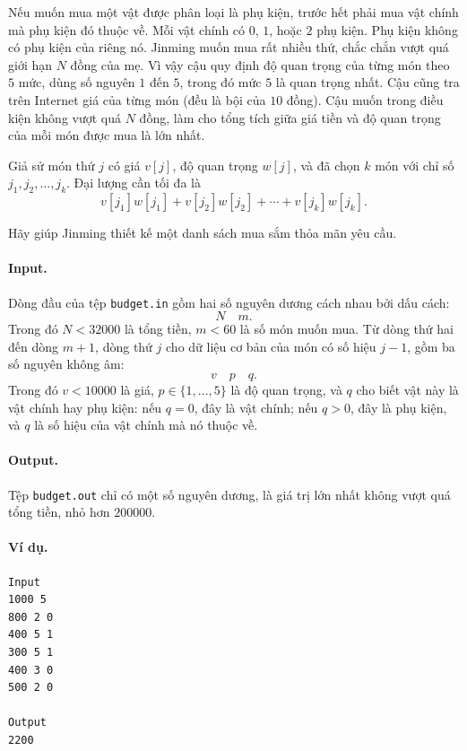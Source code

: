 \documentclass[11pt]{article}
\begin{document}
Nếu muốn mua một vật được phân loại là phụ kiện, trước hết phải mua vật chính
mà phụ kiện đó thuộc về. Mỗi vật chính có \(0\), \(1\), hoặc \(2\) phụ kiện.
Phụ kiện không có phụ kiện của riêng nó. Jinming muốn mua rất nhiều thứ, chắc
chắn vượt quá giới hạn \(N\) đồng của mẹ. Vì vậy cậu quy định độ quan trọng
của từng món theo \(5\) mức, dùng số nguyên \(1\) đến \(5\), trong đó mức \(5\)
là quan trọng nhất. Cậu cũng tra trên Internet giá của từng món (đều là bội
của \(10\) đồng). Cậu muốn trong điều kiện không vượt quá \(N\) đồng, làm cho
tổng tích giữa giá tiền và độ quan trọng của mỗi món được mua là lớn nhất.

Giả sử món thứ \(j\) có giá \(v[j]\), độ quan trọng \(w[j]\), và đã chọn \(k\)
món với chỉ số \(j_1,j_2,\ldots,j_k\). Đại lượng cần tối đa là
\[
  v[j_1]w[j_1]+v[j_2]w[j_2]+\cdots+v[j_k]w[j_k].
\]

Hãy giúp Jinming thiết kế một danh sách mua sắm thỏa mãn yêu cầu.

\paragraph{Input.}
Dòng đầu của tệp \texttt{budget.in} gồm hai số nguyên dương cách nhau bởi dấu
cách:
\[
  N\quad m.
\]
Trong đó \(N<32000\) là tổng tiền, \(m<60\) là số món muốn mua. Từ dòng thứ
hai đến dòng \(m+1\), dòng thứ \(j\) cho dữ liệu cơ bản của món có số hiệu
\(j-1\), gồm ba số nguyên không âm:
\[
  v\quad p\quad q.
\]
Trong đó \(v<10000\) là giá, \(p\in\{1,\ldots,5\}\) là độ quan trọng, và \(q\)
cho biết vật này là vật chính hay phụ kiện: nếu \(q=0\), đây là vật chính; nếu
\(q>0\), đây là phụ kiện, và \(q\) là số hiệu của vật chính mà nó thuộc về.

\paragraph{Output.}
Tệp \texttt{budget.out} chỉ có một số nguyên dương, là giá trị lớn nhất không
vượt quá tổng tiền, nhỏ hơn \(200000\).

\paragraph{Ví dụ.}
\begin{verbatim}
Input
1000 5
800 2 0
400 5 1
300 5 1
400 3 0
500 2 0

Output
2200
\end{verbatim}
\end{document}
